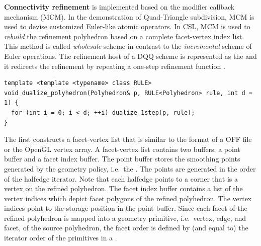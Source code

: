 \noindent \textbf{Connectivity refinement} is implemented
based on the modifier callback mechanism (MCM). In the 
demonstration of Quad-Triangle subdivision, MCM is used to devise 
customized Euler-like atomic operators. In CSL, MCM is used to 
\emph{rebuild} the refinement polyhedron based on 
a complete facet-vertex index list. This method is called \emph{wholesale} 
scheme in contrast to the \emph{incremental} scheme of Euler operations.
The refinement host of a DQQ scheme is represented as the
 and it
redirects the refinement by repeating a one-step
refinement function .
\begin{lstlisting}
template <template <typename> class RULE>
void dualize_polyhedron(Polyhedron& p, RULE<Polyhedron> rule, int d = 1) {
  for (int i = 0; i < d; ++i) dualize_1step(p, rule);
}
\end{lstlisting}
The  first constructs a facet-vertex list
that is similar to the format of a OFF file or the OpenGL vertex
array. A facet-vertex list contains two buffers: a point buffer and a
facet index buffer. The point buffer stores the smoothing points
generated by the geometry policy, i.e.\ the .
The points are generated in the order of the halfedge iterator. Note
that each halfedge points to a corner that is a vertex on the refined
polyhedron.  The facet index buffer contains a list of the vertex
indices which depict facet polygons of the refined polyhedron. The
vertex indices point to the storage position in the point
buffer. Since each facet of the refined polyhedron is mapped into a
geometry primitive, i.e.\ vertex, edge, and facet, of the source
polyhedron, the facet order is defined by (and equal to) the iterator
order of the primitives in a \cgalpoly .
